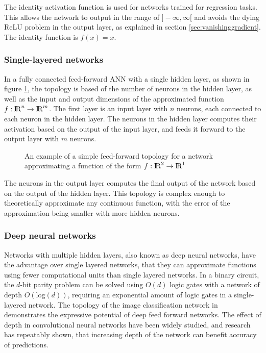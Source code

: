 The identity activation function is used for networks trained for regression tasks. This allows the network to output in the range of $]-\infty,\infty[$ and avoids the dying ReLU problem in the output layer, as explained in section \ref{sec:vanishinggradient}. The identity function is $f(x) = x$.


\subsubsection{Single-layered networks}
In a fully connected feed-forward ANN with a single hidden layer, as shown in figure \ref{fig:fft}, the topology is based of the number of neurons in the hidden layer, as well as the input and output dimensions of the approximated function $f:{\rm I\!R}^n \rightarrow {\rm I\!R}^m$. The first layer is an input layer with $n$ neurons, each connected to each neuron in the hidden layer. The neurons in the hidden layer computes their activation based on the output of the input layer, and feeds it forward to the output layer with $m$ neurons.

\begin{figure}[H]
    \centering
    \vspace{-0.8cm}
    
    \caption[Simple feed-forward topology]{An example of a simple feed-forward topology for a network approximating a function of the form $f:{\rm I\!R}^2 \rightarrow {\rm I\!R}^1$}
    \label{fig:fft}
\end{figure}

The neurons in the output layer computes the final output of the network based on the output of the hidden layer. This topology is complex enough to theoretically approximate any continuous function, with the error of the approximation being smaller with more hidden neurons.

\subsubsection{Deep neural networks}
Networks with multiple hidden layers, also known as deep neural networks, have the advantage over single layered networks, that they can approximate functions using fewer computational units than single layered networks\cite{yoshua}. In a binary circuit, the $d$-bit parity problem can be solved using $O(d)$ logic gates with a network of depth $O(\text{log}(d))$, requiring an exponential amount of logic gates\cite{Yao} in a single-layered network. The topology of the image classification network in \cite{christian} demonstrates the expressive potential of deep feed forward networks. The effect of depth in convolutional neural networks have been widely studied, and research has repeatably shown, that increasing depth of the network can benefit accuracy of predictions\cite{karen}.

